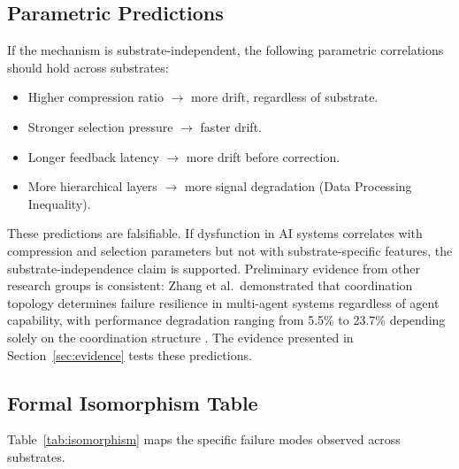 \documentclass[11pt,a4paper]{article}
\begin{document}
\subsection{Parametric Predictions}

If the mechanism is substrate-independent, the following parametric correlations should hold across substrates:

\begin{itemize}
\item Higher compression ratio $\to$ more drift, regardless of substrate.
\item Stronger selection pressure $\to$ faster drift.
\item Longer feedback latency $\to$ more drift before correction.
\item More hierarchical layers $\to$ more signal degradation (Data Processing Inequality).
\end{itemize}

These predictions are falsifiable. If dysfunction in AI systems correlates with compression and selection parameters but not with substrate-specific features, the substrate-independence claim is supported. Preliminary evidence from other research groups is consistent: Zhang et al.\ demonstrated that coordination topology determines failure resilience in multi-agent systems regardless of agent capability, with performance degradation ranging from 5.5\% to 23.7\% depending solely on the coordination structure \citep{zhang2025resilience}. The evidence presented in Section~\ref{sec:evidence} tests these predictions.

\subsection{Formal Isomorphism Table}

Table~\ref{tab:isomorphism} maps the specific failure modes observed across substrates.
\end{document}
